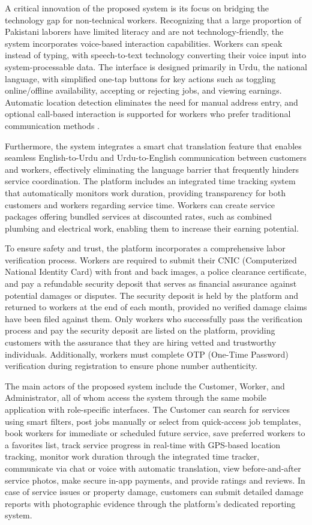 \documentclass[12pt,a4paper]{report}
\begin{document}
A critical innovation of the proposed system is its focus on bridging the
technology gap for non-technical workers. Recognizing that a large proportion of
Pakistani laborers have limited literacy and are not technology-friendly, the
system incorporates voice-based interaction capabilities. Workers can speak
instead of typing, with speech-to-text technology converting their voice input
into system-processable data. The interface is designed primarily in Urdu, the
national language, with simplified one-tap buttons for key actions such as
toggling online/offline availability, accepting or rejecting jobs, and viewing
earnings. Automatic location detection eliminates the need for manual address
entry, and optional call-based interaction is supported for workers who prefer
traditional communication methods \cite{ahmed2021}.

Furthermore, the system integrates a smart chat translation feature that enables
seamless English-to-Urdu and Urdu-to-English communication between customers
and workers, effectively eliminating the language barrier that frequently hinders
service coordination. The platform includes an integrated time tracking system
that automatically monitors work duration, providing transparency for both
customers and workers regarding service time. Workers can create service packages
offering bundled services at discounted rates, such as combined plumbing and
electrical work, enabling them to increase their earning potential.

To ensure safety and trust, the platform incorporates a comprehensive labor
verification process. Workers are required to submit their CNIC (Computerized
National Identity Card) with front and back images, a police clearance
certificate, and pay a refundable security deposit that serves as financial
assurance against potential damages or disputes. The security deposit is held by
the platform and returned to workers at the end of each month, provided no
verified damage claims have been filed against them. Only workers who
successfully pass the verification process and pay the security deposit are
listed on the platform, providing customers with the assurance that they are
hiring vetted and trustworthy individuals. Additionally, workers must complete
OTP (One-Time Password) verification during registration to ensure phone number
authenticity.

The main actors of the proposed system include the Customer, Worker, and
Administrator, all of whom access the system through the same mobile application
with role-specific interfaces. The Customer can search for services using smart
filters, post jobs manually or select from quick-access job templates, book
workers for immediate or scheduled future service, save preferred workers to a
favorites list, track service progress in real-time with GPS-based location
tracking, monitor work duration through the integrated time tracker, communicate
via chat or voice with automatic translation, view before-and-after service
photos, make secure in-app payments, and provide ratings and reviews. In case of
service issues or property damage, customers can submit detailed damage reports
with photographic evidence through the platform's dedicated reporting system.
\end{document}
